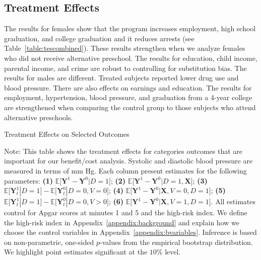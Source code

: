 \subsection{Treatment Effects}

The results for females show that the program increases employment, high school graduation, and college graduation and it reduces arrests (see Table~\ref{table:tescombined}). These results strengthen when we analyze females who did not receive alternative preschool. The results for education, child income, parental income, and crime are robust to controlling for substitution bias. The results for males are different. Treated subjects reported lower drug use and blood pressure. There are also effects on earnings and education. The results for employment, hypertension, blood pressure, and graduation from a 4-year college are strengthened when comparing the control group to those subjects who attend alternative preschools.

\begin{table}[!htbp]
\centering
\begin{threeparttable}
\caption{Treatment Effects on Selected Outcomes}\label{table:tescombined}
\begin{scriptsize}

\end{scriptsize}
\begin{tablenotes}
\tiny
Note: This table shows the treatment effects for categories outcomes that are important for our benefit/cost analysis. Systolic and diastolic blood pressure are measured in terms of mm Hg. Each column present estimates for the following parameters: \textbf{(1)} $\mathbb{E} \big[ \bm{Y}^1 - \bm{Y}^0 | D = 1]$; {\textbf{(2)} $\mathbb{E} \big[ \bm{Y}^1 - \bm{Y}^0 | D = 1, \bm{X} \big]$}; {\textbf{(3)} $\mathbb{E} \big[ \bm{Y}^1_t | D=1 \big] - \mathbb{E} \big[ \bm{Y}^0_t | D=0, V=0 \big]$}; {\textbf{(4)} $\mathbb{E} \big[ \bm{Y}^1 - \bm{Y}^0 | \bm{X}, V=0, D = 1 \big] $}; {\textbf{(5)} $\mathbb{E} \big[ \bm{Y}^1_t | D=1 \big] - \mathbb{E} \big[ \bm{Y}^0_t | D=0, V>0 \big]$}; {\textbf{(6)} $\mathbb{E} \big[ \bm{Y}^1 - \bm{Y}^0 | \bm{X}, V=1 , D = 1\big]$}. All estimates control for Apgar scores at minutes 1 and 5 and the high-risk index. We define the high-risk index in Appendix~\ref{appendix:background} and explain how we choose the control variables in Appendix~\ref{appendix:bvariables}. Inference is based on non-parametric, one-sided $p$-values from the empirical bootstrap distribution. We highlight point estimates significant at the $10\%$ level.
\end{tablenotes}
\end{threeparttable}
\end{table}
\restoregeometry
\doublespacing

